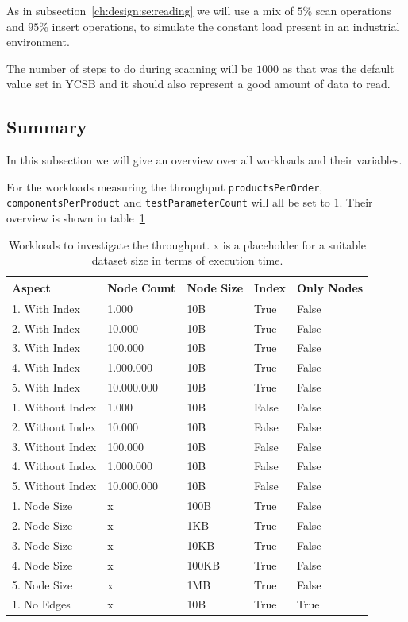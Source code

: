 As in subsection~\ref{ch:design:se:reading} we will use a mix of $ 5\% $ scan operations and $ 95\% $ insert operations,
to simulate the constant load present in an industrial environment.

The number of steps to do during scanning will be $ 1000 $ as that was the default value set in YCSB and it should also represent a good amount of data to read.

\subsection{Summary}
\label{ch:design:se:summary}
In this subsection we will give an overview over all workloads and their variables.

For the workloads measuring the throughput \texttt{productsPerOrder},
\texttt{componentsPerProduct} and \texttt{testParameterCount} will all be set to $ 1 $.
Their overview is shown in table~\ref{tab:throughput}

\begin{table}[!h]
  \begin{minipage}{\textwidth}
    \begin{tabularx}{\textwidth}{ | X | X | X | X | X | }
      \hline
      Aspect & Node Count & Node Size & Index & Only Nodes \\ \hline
      1. With Index & 1.000 & 10B & True & False \\ \hline
      2. With Index & 10.000 & 10B & True & False \\ \hline
      3. With Index & 100.000 & 10B & True & False \\ \hline
      4. With Index & 1.000.000 & 10B & True & False \\ \hline
      5. With Index & 10.000.000 & 10B & True & False \\ \hline
      1. Without Index & 1.000 & 10B & False & False \\ \hline
      2. Without Index & 10.000 & 10B & False & False \\ \hline
      3. Without Index & 100.000 & 10B & False & False \\ \hline
      4. Without Index & 1.000.000 & 10B & False & False \\ \hline
      5. Without Index & 10.000.000 & 10B & False & False \\ \hline
      1. Node Size & x & 100B & True & False \\ \hline
      2. Node Size & x & 1KB & True & False \\ \hline
      3. Node Size & x & 10KB & True & False \\ \hline
      4. Node Size & x & 100KB & True & False \\ \hline
      5. Node Size & x & 1MB & True & False \\ \hline
      1. No Edges & x & 10B & True & True \\ \hline
    \end{tabularx}
  \end{minipage}
  \caption{Workloads to investigate the throughput. x is a placeholder for a suitable dataset size in terms of execution time.}
  \label{tab:throughput}
\end{table}


